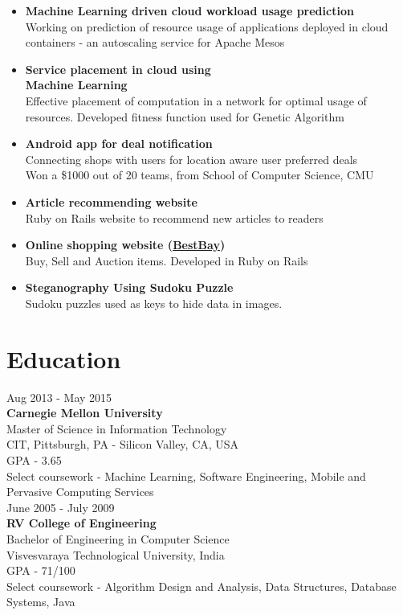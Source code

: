 \documentclass{tccv}
\begin{document}
\begin{itemize}

\item\textbf{Machine Learning driven cloud workload usage prediction}\\
     {Working on prediction of resource usage of applications deployed in cloud containers - an autoscaling service for Apache Mesos}
\item\textbf{Service placement in cloud using \\Machine Learning}\\
     {Effective placement of computation in a network for optimal usage of resources. Developed fitness function 
used for Genetic Algorithm}

\item\textbf{Android app for deal notification}\\
     {Connecting shops with users for location aware user preferred deals}\\
     Won a \$1000 {} out of 20 teams, from School of Computer Science, CMU

\item\textbf{Article recommending website}\\
     {Ruby on Rails website to recommend new articles to readers}
\item\textbf{Online shopping website (\href{http://rhbestbay.herokuapp.com/}{BestBay})}\\
     {Buy, Sell and Auction items. Developed in Ruby on Rails}
\item\textbf{Steganography Using Sudoku Puzzle}\\
     {Sudoku puzzles used as keys to hide data in images.
     }

\end{itemize}

\section{Education}

{\hfill\sc Aug 2013 - May 2015}\\
\textbf{Carnegie Mellon University}\\ 
Master of Science in Information Technology\\
CIT, Pittsburgh, PA - Silicon Valley, CA, USA\\
GPA - 3.65\\
Select coursework - Machine Learning, Software Engineering, Mobile and Pervasive Computing Services\\

{\hfill\sc June 2005 - July 2009}\\
\textbf{RV College of Engineering}\\
Bachelor of Engineering in Computer Science\\
Visvesvaraya Technological University, India\\
GPA - 71/100\\
Select coursework - Algorithm Design and Analysis, Data Structures, Database Systems, Java\\ 
\end{document}
